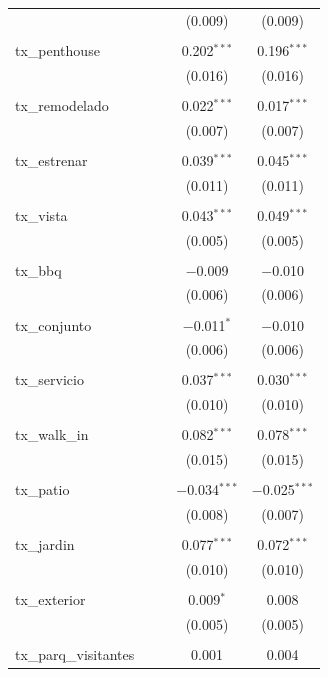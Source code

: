\begin{table}[!htbp]
\begin{tabular}{@{\extracolsep{5pt}}lcccc}
  &  &  & (0.009) & (0.009) \\ 
  & & & & \\ 
 tx\_penthouse &  &  & 0.202$^{***}$ & 0.196$^{***}$ \\ 
  &  &  & (0.016) & (0.016) \\ 
  & & & & \\ 
 tx\_remodelado &  &  & 0.022$^{***}$ & 0.017$^{***}$ \\ 
  &  &  & (0.007) & (0.007) \\ 
  & & & & \\ 
 tx\_estrenar &  &  & 0.039$^{***}$ & 0.045$^{***}$ \\ 
  &  &  & (0.011) & (0.011) \\ 
  & & & & \\ 
 tx\_vista &  &  & 0.043$^{***}$ & 0.049$^{***}$ \\ 
  &  &  & (0.005) & (0.005) \\ 
  & & & & \\ 
 tx\_bbq &  &  & $-$0.009 & $-$0.010 \\ 
  &  &  & (0.006) & (0.006) \\ 
  & & & & \\ 
 tx\_conjunto &  &  & $-$0.011$^{*}$ & $-$0.010 \\ 
  &  &  & (0.006) & (0.006) \\ 
  & & & & \\ 
 tx\_servicio &  &  & 0.037$^{***}$ & 0.030$^{***}$ \\ 
  &  &  & (0.010) & (0.010) \\ 
  & & & & \\ 
 tx\_walk\_in &  &  & 0.082$^{***}$ & 0.078$^{***}$ \\ 
  &  &  & (0.015) & (0.015) \\ 
  & & & & \\ 
 tx\_patio &  &  & $-$0.034$^{***}$ & $-$0.025$^{***}$ \\ 
  &  &  & (0.008) & (0.007) \\ 
  & & & & \\ 
 tx\_jardin &  &  & 0.077$^{***}$ & 0.072$^{***}$ \\ 
  &  &  & (0.010) & (0.010) \\ 
  & & & & \\ 
 tx\_exterior &  &  & 0.009$^{*}$ & 0.008 \\ 
  &  &  & (0.005) & (0.005) \\ 
  & & & & \\ 
 tx\_parq\_visitantes &  &  & 0.001 & 0.004 \\ 

\end{tabular}
\end{table}
